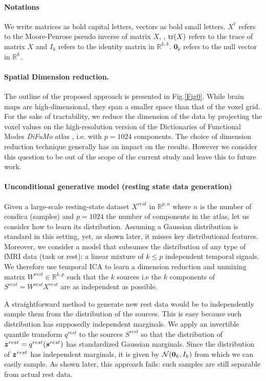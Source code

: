 \paragraph{Notations}
We write matrices as bold capital letters, vectors as bold small letters.
$X^{\dagger}$ refers to the Moore-Penrose pseudo inverse of matrix $X$,
, $\mathop{\mathrm{tr}}(X)$ refers to the trace of matrix $X$ and
$I_k$ refers to the identity matrix in $\mathbb{R}^{k, k}$. $\mathbf{0}_k$ refers to
the null vector in $\mathbb{R}^k$.

\paragraph{Spatial Dimension reduction.} 
The outline of the proposed approach is presented in Fig.\ref{Fig0}.
%
While brain maps are high-dimensional, they span a smaller space than that of
the voxel grid. 
%
For the sake of tractability, we reduce the dimension of the data by projecting the voxel values on the
high-resolution version of the Dictionaries of Functional Modes \emph{DiFuMo}
atlas \cite{dadi_fine-grain_2020}, i.e. with $p=1024$ components.
%
The choice of dimension reduction technique generally has an impact on the
results. However we consider this question to be out of the scope of the current study and leave this to future work.

\paragraph{Unconditional generative model (resting state data generation)}
Given a large-scale resting-state dataset $X^{rest}$ in $\mathbb{R}^{p,n}$ where $n$ is the number of condica (samples) and $p=1024$ the number of components in the atlas, let us consider how to learn its distribution.
%
Assuming a Gaussian distribution is standard in this setting, yet, as
shown later, it misses key distributional features.
%
Moreover, we consider a model that subsumes the distribution of any type of
fMRI data (task or rest): a linear mixture of $k \leq p$ independent temporal signals.
%
We therefore use temporal ICA to learn a dimension reduction and unmixing matrix
$W^{rest} \in \mathbb{R}^{k, p}$ such that the $k$ sources i.e the $k$ components of
$S^{rest} = W^{rest} X^{rest}$ are as
independent as possible.
%
 
%

A straightforward method to generate new rest data would be to
independently sample them from the distribution of the sources.
%
This is easy because such distribution has supposedly independent marginals.
We apply an invertible quantile transform $q^{rest}$ to the sources $S^{rest}$ so that
the distribution of $\boldsymbol{z}^{rest} =
q^{rest}(\boldsymbol{s}^{rest})$ has standardized Gaussian marginals. Since the distribution of
$\boldsymbol{z}^{rest}$ has independent marginals, it is given by $\mathcal{N}({\boldsymbol{0}}_k, I_k)$
from which we can easily sample.
As shown later, this approach fails: such samples are still separable
from actual rest data.
%

